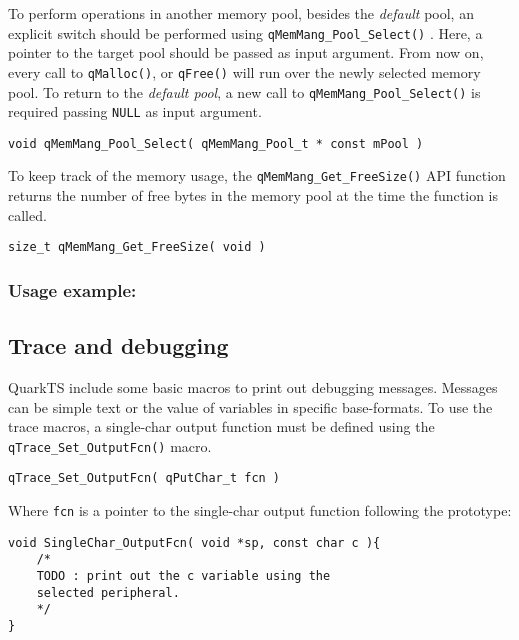 To perform operations in another memory pool, besides the \textit{default} pool, an explicit switch should be performed using \lstinline{qMemMang_Pool_Select()} . Here, a pointer to the target pool should be passed as input argument.  From now on, every call to \lstinline{qMalloc()}, or \lstinline{qFree()} will run over the newly selected memory pool. To return to  the \textit{default pool},  a new call to  \lstinline{qMemMang_Pool_Select()} is required passing \lstinline{NULL} as input argument. 
\medskip

\begin{lstlisting}[style=CStyle]
void qMemMang_Pool_Select( qMemMang_Pool_t * const mPool )
\end{lstlisting}

To keep track of the memory usage, the \lstinline{qMemMang_Get_FreeSize()}  API function returns the number of free bytes in the memory pool at the time the function is called.
\medskip

\begin{lstlisting}[style=CStyle]
size_t qMemMang_Get_FreeSize( void )
\end{lstlisting}

\subsubsection*{Usage example:}



\subsection{Trace and debugging}
QuarkTS include some basic macros to print out debugging messages. Messages can be simple text or the value of variables in specific base-formats. 
To use the trace macros, a single-char output function must be defined using the \lstinline{qTrace_Set_OutputFcn()} macro.
\medskip

\begin{lstlisting}[style=CStyle]
qTrace_Set_OutputFcn( qPutChar_t fcn )
\end{lstlisting}

Where \lstinline{fcn} is a pointer to the single-char output function following the prototype:
\medskip

\begin{lstlisting}[style=CStyle]
void SingleChar_OutputFcn( void *sp, const char c ){
    /*
    TODO : print out the c variable using the
    selected peripheral.
    */
}
\end{lstlisting}

